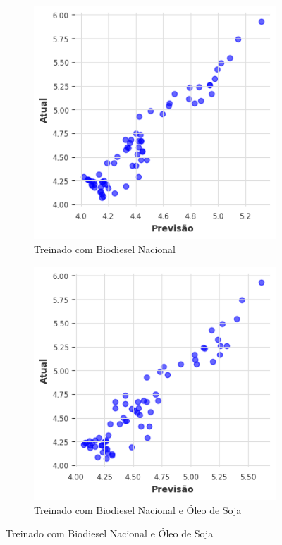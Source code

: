 \begin{figure}[htbp]
	\centering
	\begin{subfigure}[b]{0.40\textwidth}
		\centering
		\includegraphics[width=\textwidth]{figuras/idln_takens_brasil_scatter.png} %
		\caption{Treinado com Biodiesel Nacional \newline}
		\label{fig:idln_takens_brasil_scatter}
	\end{subfigure}
	\hfill
	\begin{subfigure}[b]{0.40\textwidth}
		\centering
		\includegraphics[width=\textwidth]{figuras/idln_takens_brasil_oil_scatter.png} %
		\caption{Treinado com Biodiesel Nacional e Óleo de Soja}
		\label{fig:idln_takens_brasil_oil_scatter}
	\end{subfigure}


\end{figure}
